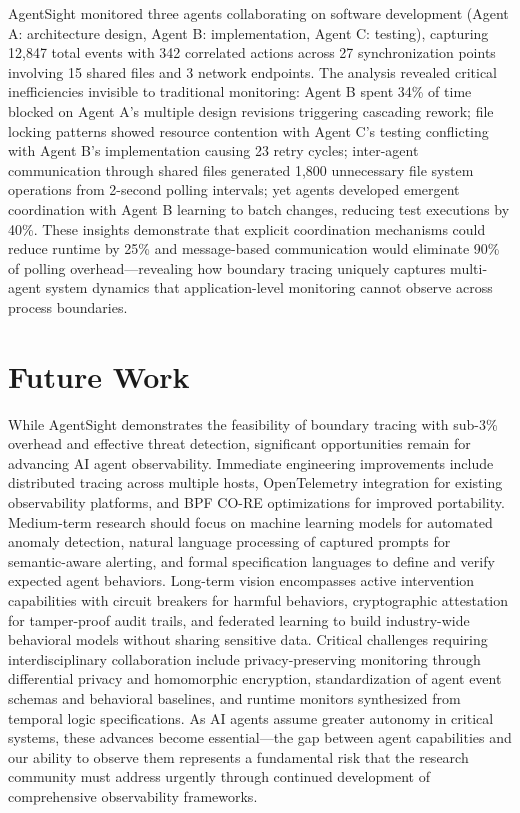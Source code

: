 AgentSight monitored three agents collaborating on software development (Agent A: architecture design, Agent B: implementation, Agent C: testing), capturing 12,847 total events with 342 correlated actions across 27 synchronization points involving 15 shared files and 3 network endpoints. The analysis revealed critical inefficiencies invisible to traditional monitoring: Agent B spent 34\% of time blocked on Agent A's multiple design revisions triggering cascading rework; file locking patterns showed resource contention with Agent C's testing conflicting with Agent B's implementation causing 23 retry cycles; inter-agent communication through shared files generated 1,800 unnecessary file system operations from 2-second polling intervals; yet agents developed emergent coordination with Agent B learning to batch changes, reducing test executions by 40\%. These insights demonstrate that explicit coordination mechanisms could reduce runtime by 25\% and message-based communication would eliminate 90\% of polling overhead—revealing how boundary tracing uniquely captures multi-agent system dynamics that application-level monitoring cannot observe across process boundaries.


\section{Future Work}

While AgentSight demonstrates the feasibility of boundary tracing with sub-3\% overhead and effective threat detection, significant opportunities remain for advancing AI agent observability. Immediate engineering improvements include distributed tracing across multiple hosts, OpenTelemetry integration for existing observability platforms, and BPF CO-RE optimizations for improved portability. Medium-term research should focus on machine learning models for automated anomaly detection, natural language processing of captured prompts for semantic-aware alerting, and formal specification languages to define and verify expected agent behaviors. Long-term vision encompasses active intervention capabilities with circuit breakers for harmful behaviors, cryptographic attestation for tamper-proof audit trails, and federated learning to build industry-wide behavioral models without sharing sensitive data. Critical challenges requiring interdisciplinary collaboration include privacy-preserving monitoring through differential privacy and homomorphic encryption, standardization of agent event schemas and behavioral baselines, and runtime monitors synthesized from temporal logic specifications. As AI agents assume greater autonomy in critical systems, these advances become essential—the gap between agent capabilities and our ability to observe them represents a fundamental risk that the research community must address urgently through continued development of comprehensive observability frameworks.


